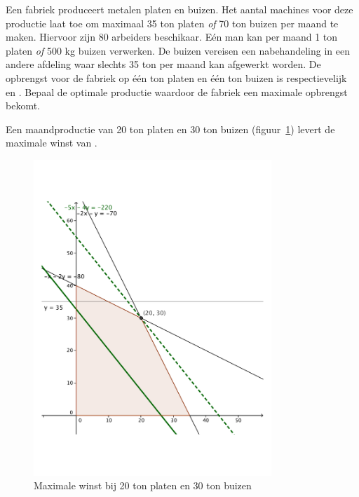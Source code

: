 \begin{oef}
Een fabriek produceert metalen platen en buizen.
     Het aantal machines voor deze productie laat toe om maximaal 35
     ton platen \emph{of} 70 ton buizen per maand te maken. Hiervoor zijn 80
     arbeiders beschikaar. E\'en man kan per maand 1 ton platen \emph{of} 500
     kg buizen verwerken. De buizen vereisen een nabehandeling in een
     andere afdeling waar slechts 35 ton per maand kan afgewerkt
     worden.   De opbrengst voor de fabriek op \'e\'en ton platen en
     \'e\'en ton buizen is respectievelijk  en
     . Bepaal  de optimale
     productie waardoor de fabriek een maximale opbrengst bekomt. 
     \begin{opl}
     Een maandproductie van 20 ton platen en 30 ton buizen (figuur~\ref{fig:platenbuizen}) levert de maximale winst van .
                 \begin{figure}[hbtp]
\centering
\includegraphics[width=0.8\textwidth]{oefeningen/FigurenLP/OefPlatenBuizen.pdf}
\caption{Maximale winst bij 20 ton platen en 30 ton buizen}
\label{fig:platenbuizen}
\end{figure}
\clearpage
     \end{opl}
\end{oef}
     


